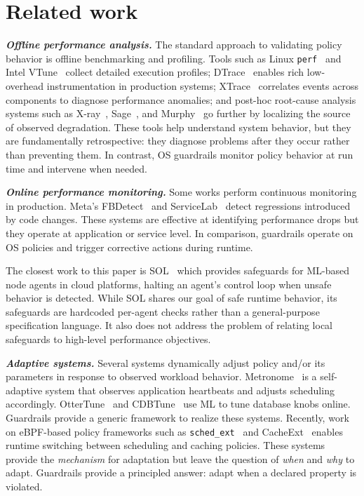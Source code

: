 \section{Related work}
\label{sec:related}

\noindent
{\bf {\em Offline performance analysis.}}
The standard approach to validating policy behavior is offline benchmarking and profiling. Tools such as Linux \texttt{perf}~\cite{linuxperf} and Intel VTune~\cite{vtune} collect detailed execution profiles; DTrace~\cite{cantrill2004dynamic} enables rich low-overhead instrumentation in production systems; XTrace~\cite{xtrace} correlates events across components to diagnose performance anomalies; and post-hoc root-cause analysis systems such as X-ray~\cite{xray-osdi12}, Sage~\cite{sage-asplos21}, and Murphy~\cite{murphy-sigcomm23} go further by localizing the source of observed degradation. These tools help understand system behavior, but they are fundamentally retrospective: they diagnose problems after they occur rather than preventing them. In contrast, OS guardrails monitor policy behavior at run time and intervene when needed.

\noindent
{\bf {\em Online performance monitoring.}}
Some works perform continuous monitoring in production. Meta's FBDetect~\cite{fbdetect-sosp24} and ServiceLab~\cite{servicelab-osdi24} detect regressions introduced by code changes. These systems are effective at identifying performance drops but they operate at application or service level. In comparison, guardrails operate on OS policies and trigger corrective actions during runtime.

The closest work to this paper is SOL~\cite{sol-asplos22} which provides safeguards for ML-based node agents in cloud platforms, halting an agent's control loop when unsafe behavior is detected. While SOL shares our goal of safe runtime behavior, its safeguards are hardcoded per-agent checks rather than a general-purpose specification language. It also does not address the problem of relating local safeguards to high-level performance objectives.

\noindent
{\bf {\em Adaptive systems.}}
Several systems dynamically adjust policy and/or its parameters in response to observed workload behavior. Metronome~\cite{metronome12} is a self-adaptive system that observes application heartbeats and adjusts scheduling accordingly. OtterTune~\cite{ottertune-sigmod17} and CDBTune~\cite{cdbtune-sigmod19} use ML to tune database knobs online. Guardrails provide a generic framework to realize these systems.
Recently, work on eBPF-based policy frameworks such as \texttt{sched_ext}~\cite{sched-ext} and CacheExt~\cite{cache-ext-sosp25} enables runtime switching between scheduling and caching policies. These systems provide the \emph{mechanism} for adaptation but leave the question of \emph{when} and \emph{why} to adapt. Guardrails provide a principled answer: adapt when a declared property is violated.

